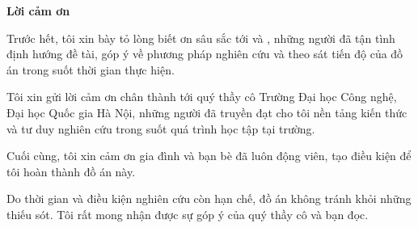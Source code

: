 \begin{center}
\textbf{\large{Lời cảm ơn}	}
\end{center}
Trước hết, tôi xin bày tỏ lòng biết ơn sâu sắc tới \gvhd{} và \gvdhd{}, những người đã tận tình định hướng đề tài, góp ý về phương pháp nghiên cứu và theo sát tiến độ của đồ án trong suốt thời gian thực hiện.

Tôi xin gửi lời cảm ơn chân thành tới quý thầy cô Trường Đại học Công nghệ, Đại học Quốc gia Hà Nội, những người đã truyền đạt cho tôi nền tảng kiến thức và tư duy nghiên cứu trong suốt quá trình học tập tại trường.

Cuối cùng, tôi xin cảm ơn gia đình và bạn bè đã luôn động viên, tạo điều kiện để tôi hoàn thành đồ án này.

Do thời gian và điều kiện nghiên cứu còn hạn chế, đồ án không tránh khỏi những thiếu sót. Tôi rất mong nhận được sự góp ý của quý thầy cô và bạn đọc.

